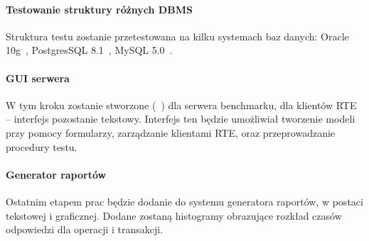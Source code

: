\paragraph{Testowanie struktury różnych DBMS}
Struktura testu zostanie przetestowana na kilku systemach baz danych: 
Oracle 10g~\cite{Oracle1}, PostgresSQL 8.1~\cite{PostgreSql1}, MySQL 5.0~\cite{MySql1}.

\paragraph{GUI serwera}
W tym kroku zostanie stworzone  (~\cite{GUI}) dla serwera benchmarku,
dla klientów RTE -- interfejs pozostanie tekstowy. Interfejs ten będzie umożliwiał
tworzenie modeli przy pomocy formularzy, zarządzanie klientami RTE, oraz przeprowadzanie procedury testu. 

\paragraph{Generator raportów}
Ostatnim etapem prac będzie dodanie do systemu generatora raportów, w postaci tekstowej
i graficznej. Dodane zostaną histogramy obrazujące rozkład czasów odpowiedzi dla
operacji i transakcji.
